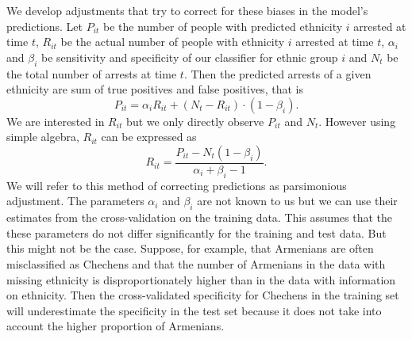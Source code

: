 We develop adjustments that try to correct for these biases in the model's predictions. Let $P_{it}$ be the number of people with predicted ethnicity $i$ arrested at time $t$, $R_{it}$ be the actual number of people with ethnicity $i$ arrested at time $t$, $\alpha_i$ and $\beta_i$  be sensitivity and specificity of our classifier for ethnic group $i$ and $N_t$ be the total number of arrests at time $t$. Then the predicted arrests of a given ethnicity are sum of true positives and false positives, that is
\begin{equation}
    P_{it} = \alpha_i R_{it} + \left( N_t - R_{it} \right) \cdot \left(1 - \beta_i \right).  
\end{equation}
We are interested in $R_{it}$ but we only directly observe $P_{it}$ and $N_t$. However using simple algebra, $R_{it}$ can be expressed as
\begin{equation} \label{eq:pars_adj}
 R_{it} = \frac{P_{it} - N_t  \left(1 - \beta_i \right)}{\alpha_i + \beta_i - 1}.
\end{equation}
We will refer to this method of correcting predictions as parsimonious adjustment.  The parameters $\alpha_i$ and $\beta_i$ are not known to us but we can use their estimates from the cross-validation on the training data. This assumes that the these parameters do not differ significantly for the training and test data. But this might not be the case. 
Suppose, for example, that Armenians are often misclassified as Chechens and that the number of Armenians in the data with missing ethnicity  is disproportionately higher than in the data with information on ethnicity. 
Then the cross-validated specificity for Chechens in the training set will underestimate the specificity in the test set because it does not take into account the higher proportion of Armenians. 

